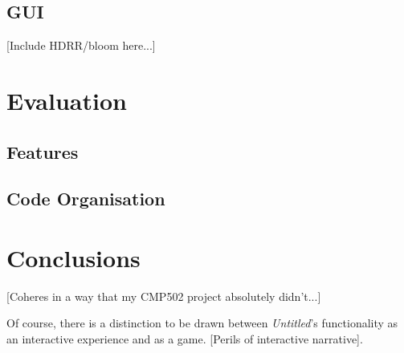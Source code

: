 \documentclass[a4paper, 11pt]{article}
\begin{document}
\begin{flushleft}
\subsection{GUI}

[Include HDRR/bloom here...]

\section{Evaluation}\label{Evaluation}

\subsection{Features}

\subsection{Code Organisation}

\section{Conclusions}

[Coheres in a way that my CMP502 project absolutely didn't...]

\vspace{5pt}\noindent
Of course, there is a distinction to be drawn between \textit{Untitled}'s functionality as an interactive experience and as a game. [Perils of interactive narrative].

\vspace{5pt}



\end{flushleft}
\end{document}
